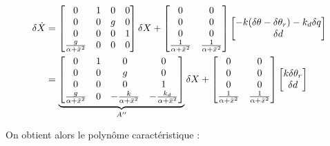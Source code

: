 \documentclass[10pt]{article}
\begin{document}
\begin{align}
\delta \dot X &=
	\begin{bmatrix}
		0 & 1 & 0 & 0 \\
		0 & 0 & g & 0 \\
		0 & 0 & 0 & 1 \\
		\frac{g}{\alpha + \bar x^2} & 0 & 0 & 0
	\end{bmatrix}
	\delta X
	+
	\begin{bmatrix}
		0 & 0 \\
		0 & 0 \\
		0 & 0 \\
		\frac{1}{\alpha + \bar x^2} & \frac{1}{\alpha + \bar x^2}
	\end{bmatrix}
	\begin{bmatrix}
		- k ( \delta \theta - \delta \theta_r ) - k_d \delta q \\ \delta d
	\end{bmatrix}
	\notag \\
	&= \underbrace{
	\begin{bmatrix}
		0 & 1 & 0 & 0 \\
		0 & 0 & g & 0 \\
		0 & 0 & 0 & 1 \\
		\frac{g}{\alpha + \bar x^2} & 0 & - \frac{k}{\alpha + \bar x^2} & - \frac{k_d}{\alpha + \bar x^2}
	\end{bmatrix}
	}_{A''}
	\delta X
	+
	\begin{bmatrix}
		0 & 0 \\
		0 & 0 \\
		0 & 0 \\
		\frac{1}{\alpha + \bar x^2} & \frac{1}{\alpha + \bar x^2}
	\end{bmatrix}
	\begin{bmatrix}
		k \delta \theta_r \\ \delta d
	\end{bmatrix}
	\notag
\end{align}

\noindent On obtient alors le polynôme caractéristique :
\end{document}
